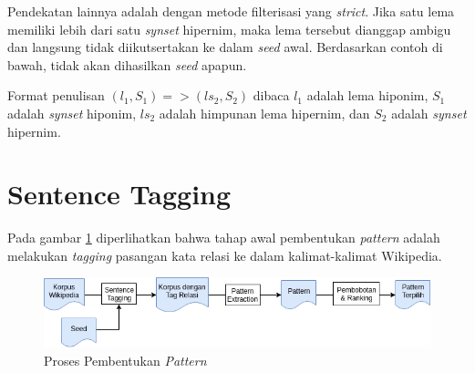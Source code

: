 Pendekatan lainnya adalah dengan metode filterisasi yang \textit{strict}. Jika satu lema memiliki lebih dari satu \textit{synset} hipernim, maka lema tersebut dianggap ambigu dan langsung tidak diikutsertakan ke dalam \textit{seed} awal. Berdasarkan contoh di bawah, tidak akan dihasilkan \textit{seed} apapun.
\begin{table}
\caption{Contoh lema dengan lebih dari satu \textit{synset} hipernim}
\label{table:contohlema}
\end{table}

\noindent Format penulisan $(l_1, S_1) => (ls_2, S_2)$ dibaca $l_1$ adalah lema hiponim, $S_1$ adalah \textit{synset} hiponim, $ls_2$ adalah himpunan lema hipernim, dan $S_2$ adalah \textit{synset} hipernim. 
%

%
\section{Sentence Tagging}
Pada gambar \ref{fig:pattern-extraction} diperlihatkan bahwa tahap awal pembentukan \textit{pattern} adalah melakukan \textit{tagging} pasangan kata relasi ke dalam kalimat-kalimat Wikipedia. 

\begin{figure}
    \centering
    \includegraphics[width=\linewidth]{pics/Pic03-PatternExtraction}
    \caption{Proses Pembentukan \textit{Pattern}}
    \label{fig:pattern-extraction}
\end{figure}

